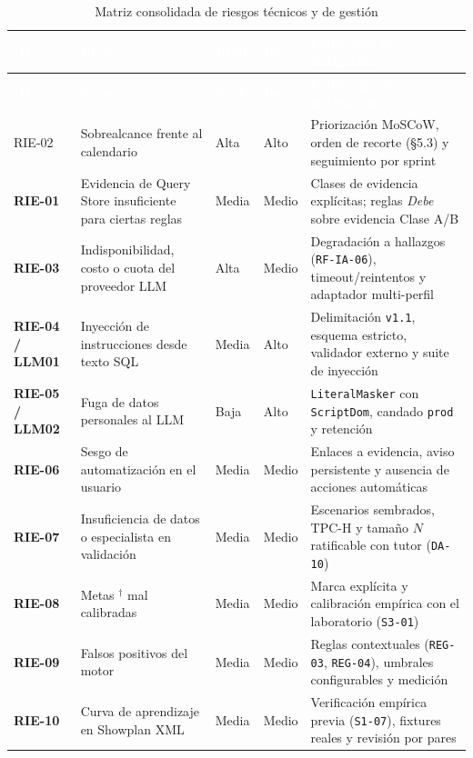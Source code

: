 \documentclass[12pt,a4paper]{article}
\newcommand{\dagsym}{\ensuremath{^{\dagger}}}
\begin{document}
\begin{longtable}{>{\bfseries}p{} p{} p{} p{} p{}}
\toprule
\rowcolor{utbblue}
\textcolor{white}{\textbf{ID}} & \textcolor{white}{\textbf{Riesgo}} & \textcolor{white}{\textbf{Prob.}} & \textcolor{white}{\textbf{Imp.}} & \textcolor{white}{\textbf{Estrategia de mitigación}} \\
\midrule
\endfirsthead
\toprule
\rowcolor{utbblue}
\textcolor{white}{\textbf{ID}} & \textcolor{white}{\textbf{Riesgo}} & \textcolor{white}{\textbf{Prob.}} & \textcolor{white}{\textbf{Imp.}} & \textcolor{white}{\textbf{Estrategia de mitigación}} \\
\midrule
\endhead
\bottomrule
\caption{Matriz consolidada de riesgos técnicos y de gestión}
\label{tab:riesgos}
\endlastfoot
RIE-02 & Sobrealcance frente al calendario & Alta & Alto & Priorización MoSCoW, orden de recorte (§5.3) y seguimiento por sprint \\
RIE-01 & Evidencia de Query Store insuficiente para ciertas reglas & Media & Medio & Clases de evidencia explícitas; reglas \textit{Debe} sobre evidencia Clase A/B \\
RIE-03 & Indisponibilidad, costo o cuota del proveedor LLM & Alta & Medio & Degradación a hallazgos (\texttt{RF-IA-06}), timeout/reintentos y adaptador multi-perfil \\
RIE-04 / LLM01 & Inyección de instrucciones desde texto SQL & Media & Alto & Delimitación \texttt{v1.1}, esquema estricto, validador externo y suite de inyección \\
RIE-05 / LLM02 & Fuga de datos personales al LLM & Baja & Alto & \texttt{LiteralMasker} con \texttt{ScriptDom}, candado \texttt{prod} y retención \\
RIE-06 & Sesgo de automatización en el usuario & Media & Medio & Enlaces a evidencia, aviso persistente y ausencia de acciones automáticas \\
RIE-07 & Insuficiencia de datos o especialista en validación & Media & Medio & Escenarios sembrados, TPC-H y tamaño $N$ ratificable con tutor (\texttt{DA-10}) \\
RIE-08 & Metas \dagsym{} mal calibradas & Media & Medio & Marca explícita y calibración empírica con el laboratorio (\texttt{S3-01}) \\
RIE-09 & Falsos positivos del motor & Media & Medio & Reglas contextuales (\texttt{REG-03}, \texttt{REG-04}), umbrales configurables y medición \\
RIE-10 & Curva de aprendizaje en Showplan XML & Media & Medio & Verificación empírica previa (\texttt{S1-07}), fixtures reales y revisión por pares \\

\end{longtable}
\end{document}
